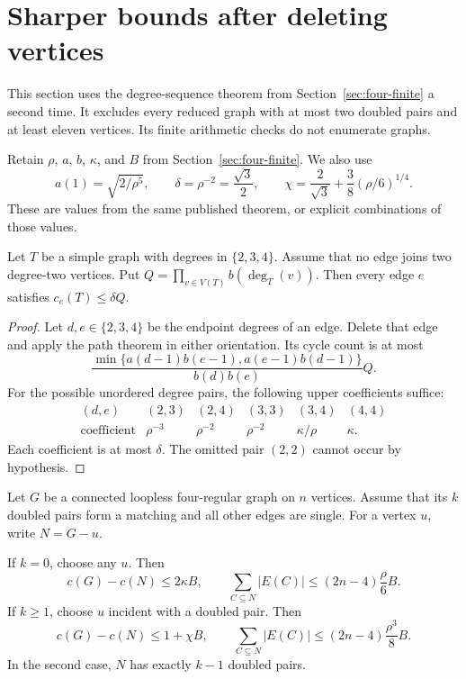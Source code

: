 \section{Sharper bounds after deleting vertices}
\label{sec:four-vertex-deletion}

This section uses the degree-sequence theorem from Section~\ref{sec:four-finite} a second time.
It excludes every reduced graph with at most two doubled pairs and at least eleven vertices.
Its finite arithmetic checks do not enumerate graphs.

Retain $\rho$, $a$, $b$, $\kappa$, and $B$ from Section~\ref{sec:four-finite}.
We also use
\[
 a(1)=\sqrt{2/\rho^5},\qquad
 \delta=\rho^{-2}=\frac{\sqrt3}{2},\qquad
 \chi=\frac2{\sqrt3}+\frac38(\rho/6)^{1/4}.
\]
These are values from the same published theorem, or explicit combinations of those values.

\begin{lemma}\label{lem:four-deleted-edge}
Let $T$ be a simple graph with degrees in $\{2,3,4\}$.
Assume that no edge joins two degree-two vertices.
Put $Q=\prod_{v\in V(T)}b(\deg_T(v))$.
Then every edge $e$ satisfies $c_e(T)\le\delta Q$.
\end{lemma}

\begin{proof}
Let $d,e\in\{2,3,4\}$ be the endpoint degrees of an edge.
Delete that edge and apply the path theorem in either orientation.
Its cycle count is at most
\[
 \frac{\min\{a(d-1)b(e-1),a(e-1)b(d-1)\}}{b(d)b(e)}Q.
\]
For the possible unordered degree pairs, the following upper coefficients suffice:
\[
\begin{array}{c|ccccc}
(d,e)&(2,3)&(2,4)&(3,3)&(3,4)&(4,4)\\\hline
\text{coefficient}&\rho^{-3}&\rho^{-2}&\rho^{-2}&\kappa/\rho&\kappa.
\end{array}
\]
Each coefficient is at most $\delta$.
The omitted pair $(2,2)$ cannot occur by hypothesis.
\end{proof}

\begin{lemma}\label{lem:four-one-vertex}
Let $G$ be a connected loopless four-regular graph on $n$ vertices.
Assume that its $k$ doubled pairs form a matching and all other edges are single.
For a vertex $u$, write $N=G-u$.

If $k=0$, choose any $u$.
Then
\[
 c(G)-c(N)\le2\kappa B,
 \qquad \sum_{C\subseteq N}|E(C)|\le(2n-4)\frac\rho6 B.
\]
If $k\ge1$, choose $u$ incident with a doubled pair.
Then
\[
 c(G)-c(N)\le1+\chi B,
 \qquad \sum_{C\subseteq N}|E(C)|\le(2n-4)\frac{\rho^3}{8}B.
\]
In the second case, $N$ has exactly $k-1$ doubled pairs.
\end{lemma}

